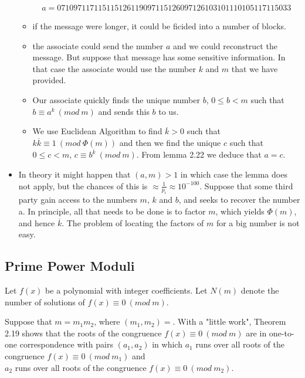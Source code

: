 \documentclass[a4paper]{article}
\begin{document}
\begin{itemize}
\begin{itemize}
        \begin{align*}
            a=071097117115115126119097115126097126103101110105117115033
        \end{align*}
        \item if the message were longer, it could be ficided into a number of blocks.
        \item the associate could send the number $a$ and we could reconstruct the message. But suppose that message has some sensitive information. In that case the associate would use the number $k$ and $m$ that we have provided.
        \item Our associate quickly finds the unique number $b$, $0\leq b<m$ such that $b\equiv a^k\ (mod\ m)$ and sends this $b$ to us.
        \item We use Euclidean Algorithm to find $\overline{k}>0$ such that\\
        $k\overline{k}\equiv 1\ (mod\ \Phi(m))$ and then we find the unique $c$ such that $0\leq c<m$, $c\equiv b^{\overline{k}}\ (mod\ m)$. From lemma 2.22 we deduce that $a=c$.
    \end{itemize}
    \item In theory it might happen that $(a,m)>1$ in which case the lemma does not apply, but the chances of this is $\approx\frac{1}{p_i}\approx 10^{-100}$. Suppose that some third party gain access to the numbers $m$, $k$ and $b$, and seeks to recover the number a. In principle, all that needs to be done is to factor $m$, which yields $\Phi(m)$, and hence $\overline{k}$. The problem of locating the factors of $m$ for a big number is not easy.
\end{itemize}


\subsection{Prime Power Moduli}

Let $f(x)$ be a polynomial with integer coefficients. Let $N(m)$ denote the number of solutions of $f(x)\equiv 0\ (mod\ m)$.

Suppose that $m=m_1m_2$, where $(m_1,m_2)=$. With a "little work", Theorem 2.19 shows that the roots of the congruence $f(x)\equiv 0\ (mod\ m)$ are in one-to-one correspondence with pairs $(a_1,a_2)$ in which $a_1$ runs over all roots of the congruence $f(x)\equiv 0\ (mod\ m_1)$ and \\
$a_2$ runs over all roots of the congruence $f(x)\equiv 0\ (mod\ m_2)$.
\end{document}
